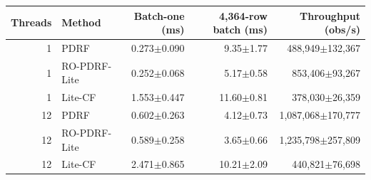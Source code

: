 \begin{tabular}{rlrrr}
\toprule
Threads & Method & Batch-one (ms) & 4,364-row batch (ms) & Throughput (obs/s) \\
\midrule
1 & PDRF & 0.273$\pm$0.090 & 9.35$\pm$1.77 & 488,949$\pm$132,367 \\
1 & RO-PDRF-Lite & 0.252$\pm$0.068 & 5.17$\pm$0.58 & 853,406$\pm$93,267 \\
1 & Lite-CF & 1.553$\pm$0.447 & 11.60$\pm$0.81 & 378,030$\pm$26,359 \\
12 & PDRF & 0.602$\pm$0.263 & 4.12$\pm$0.73 & 1,087,068$\pm$170,777 \\
12 & RO-PDRF-Lite & 0.589$\pm$0.258 & 3.65$\pm$0.66 & 1,235,798$\pm$257,809 \\
12 & Lite-CF & 2.471$\pm$0.865 & 10.21$\pm$2.09 & 440,821$\pm$76,698 \\
\bottomrule
\end{tabular}
